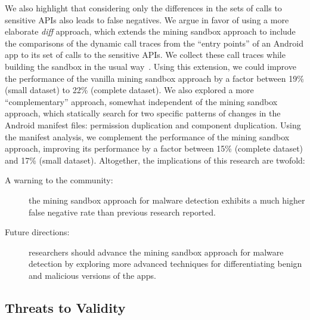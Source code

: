 We also highlight that considering only the differences in the
sets of calls to sensitive APIs also leads to false negatives. We
argue in favor of using a more elaborate \emph{diff} approach, which
extends the mining sandbox approach to include the comparisons of
the dynamic call traces from the ``entry points'' of an Android app to its
set of calls to the sensitive APIs. We collect these call traces while
building the sandbox in the usual way~\cite{DBLP:conf/icse/JamrozikSZ16}. Using this extension, we could improve
the performance of the vanilla mining sandbox approach by a factor
between 19\% (small dataset) to 22\% (complete dataset). We
also explored a more ``complementary'' approach, somewhat independent
of the mining sandbox approach, which statically search for two
specific patterns of changes in the Android manifest files: permission
duplication and component duplication. Using the manifest analysis,
we complement the performance of the mining sandbox approach, improving its performance by
a factor between 15\% (complete dataset) and 17\% (small dataset).
Altogether, the implications of this research are twofold:

\begin{description}
  \item[A warning to the community:] the mining sandbox approach for malware detection exhibits a much higher false negative rate  than previous research reported. 
  \item[Future directions:] researchers should advance the mining sandbox approach for malware detection by exploring more advanced techniques for differentiating benign and malicious versions of the apps. 
\end{description}  


\subsection{Threats to Validity}\label{sec:threats}


